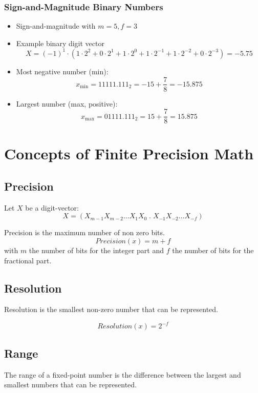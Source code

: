\documentclass[12pt,openany, tikz,border=10pt]{book}
\begin{document}
			      	\subsubsection{Sign-and-Magnitude Binary Numbers}
			      	\begin{itemize}
			      		\item[] Sign-and-magnitude with \( m = 5, f = 3 \)
			      		\item[] Example binary digit vector
			      		      \[
			      		      	X = (-1)^{1} \cdot (1 \cdot 2^2 + 0 \cdot 2^1 + 1 \cdot 2^0 + 1 \cdot 2^{-1} + 1 \cdot 2^{-2} + 0 \cdot 2^{-3}) = -5.75
			      		      \]
			      		\item[] Most negative number (min):
			      		      \[
			      		      	x_{\text{min}} = 1 1111.111_2 = -15 + \frac{7}{8} = -15.875
			      		      \]
			      		\item[] Largest number (max, positive):
			      		      \[
			      		      	x_{\text{max}} = 0 1111.111_2 = 15 + \frac{7}{8} = 15.875
			      		      \]
			      	\end{itemize}
			      	      
			      	\section{Concepts of
			      	Finite Precision Math}
			      	\subsection{Precision}
			      	Let \( X \) be a digit-vector:
			      	\[ X = (X_{m-1} X_{m-2} \dots X_1 X_0 \; . \;  X_{-1} X_{-2} \dots X_{-f}) \]
			      	
			      	Precision is the maximum number of non zero bits.
			      	$$Precision(x) = m + f$$ with \(m\) the number of bits for the integer part and \(f\) the number of bits for the fractional part.
			      	
			      	\subsection{Resolution}
			      	Resolution is the smallest non-zero number that can be represented.
			      	
			      	$$Resolution(x) = 2^{-f}$$
			      	
			      	
			      	\subsection{Range}
			      	The range of a fixed-point number is the difference between the largest and smallest numbers that can be represented.
			      	
\end{document}
